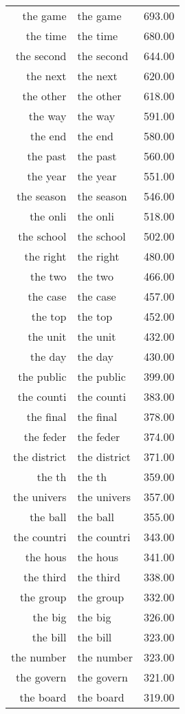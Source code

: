 \begin{table}[ht]
\begin{tabular}{rlr}
  the game & the game & 693.00 \\ 
  the time & the time & 680.00 \\ 
  the second & the second & 644.00 \\ 
  the next & the next & 620.00 \\ 
  the other & the other & 618.00 \\ 
  the way & the way & 591.00 \\ 
  the end & the end & 580.00 \\ 
  the past & the past & 560.00 \\ 
  the year & the year & 551.00 \\ 
  the season & the season & 546.00 \\ 
  the onli & the onli & 518.00 \\ 
  the school & the school & 502.00 \\ 
  the right & the right & 480.00 \\ 
  the two & the two & 466.00 \\ 
  the case & the case & 457.00 \\ 
  the top & the top & 452.00 \\ 
  the unit & the unit & 432.00 \\ 
  the day & the day & 430.00 \\ 
  the public & the public & 399.00 \\ 
  the counti & the counti & 383.00 \\ 
  the final & the final & 378.00 \\ 
  the feder & the feder & 374.00 \\ 
  the district & the district & 371.00 \\ 
  the th & the th & 359.00 \\ 
  the univers & the univers & 357.00 \\ 
  the ball & the ball & 355.00 \\ 
  the countri & the countri & 343.00 \\ 
  the hous & the hous & 341.00 \\ 
  the third & the third & 338.00 \\ 
  the group & the group & 332.00 \\ 
  the big & the big & 326.00 \\ 
  the bill & the bill & 323.00 \\ 
  the number & the number & 323.00 \\ 
  the govern & the govern & 321.00 \\ 
  the board & the board & 319.00 \\ 

\end{tabular}
\end{table}
